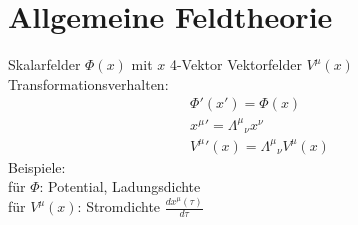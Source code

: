 \documentclass[a4paper]{article}
\begin{document}
\section{Allgemeine Feldtheorie}

Skalarfelder $\Phi(x)$ mit $x$ 4-Vektor
Vektorfelder $V^\mu(x)$
Transformationsverhalten:
\begin{align}
\Phi '(x ')=\Phi(x) \\
x^\mu {}'=\Lambda^\mu{}_\nu x^\nu\\
V^\mu {}'(x)=\Lambda^\mu{}_\nu V^\mu(x)
\end{align}
Beispiele:\\
für $\Phi$: Potential, Ladungsdichte\\
für $V^\mu(x)$: Stromdichte $\frac{dx^\mu(\tau)}{d\tau}$\\
\end{document}
